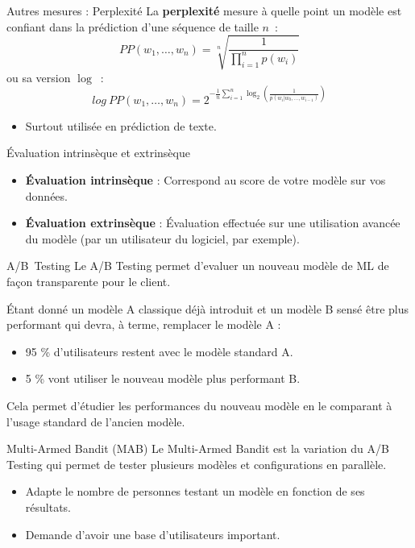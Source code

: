 \begin{frame}{Autres mesures : Perplexité}
  La \textbf{perplexité} mesure à quelle point un modèle est confiant dans la prédiction d'une séquence de taille $n$~:
  \begin{equation*}
    PP(w_1,\dots ,w_n) = \sqrt[n]{\frac{1}{\prod^n_{i=1}p(w_i)}}
  \end{equation*}
  ou sa version $\log$~:
  \begin{equation*}
    log\ PP(w_1,\dots ,w_n) = 2^{-\frac{1}{n}\sum_{i=1}^n \log_2\left(\frac{1}{p(w_i|w_0,\dots,w_{i-1})}\right)}
  \end{equation*}

  \begin{itemize}
    \item Surtout utilisée en prédiction de texte.
  \end{itemize}
\end{frame}

\begin{frame}{Évaluation intrinsèque et extrinsèque}
  \begin{itemize}
    \item \textbf{Évaluation intrinsèque} : Correspond au score de votre modèle sur vos données. 
    \item \textbf{Évaluation extrinsèque} : Évaluation effectuée sur une utilisation avancée du modèle (par un utilisateur du logiciel, par exemple).
  \end{itemize}
\end{frame}

\begin{frame}{A/B~Testing}
  Le A/B Testing permet d'evaluer un nouveau modèle de ML de façon transparente pour le client.

  Étant donné un modèle A classique déjà introduit et un modèle B sensé être plus performant qui devra, à terme, remplacer le modèle A :
  \begin{itemize}
    \item 95 \% d'utilisateurs restent avec le modèle standard A.
    \item 5 \% vont utiliser le nouveau modèle plus performant B.
  \end{itemize}
  Cela permet d'étudier les performances du nouveau modèle en le comparant à l'usage standard de l'ancien modèle.
\end{frame}

\begin{frame}{Multi-Armed Bandit (MAB)}
  Le Multi-Armed Bandit est la variation du A/B Testing qui permet de tester plusieurs modèles et configurations en parallèle.

  \begin{itemize}
    \item Adapte le nombre de personnes testant un modèle en fonction de ses résultats.
    \item Demande d'avoir une base d'utilisateurs important.
  \end{itemize}
\end{frame}

